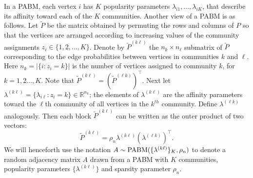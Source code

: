 \documentclass[12pt]{article}
\begin{document}
\begin{remark}
  \label{rem:pabm_view2}
In a PABM, each vertex $i$ has $K$ popularity parameters 
$\lambda_{i1}, \dots, \lambda_{iK}$, that describe its affinity
toward each of the $K$ communities. %
Another view of a PABM is as follows.
Let $\tilde{P}$ be the matrix obtained by permuting the rows and
columns of $P$ so that the vertices are arranged according to
increasing values of the community assignments $z_i \in
\{1,2,\dots,K\}$. Denote by $\tilde{P}^{(k \ell)}$ the $n_k \times n_{\ell}$
submatrix of $\tilde{P}$ corresponding to the
edge probabilities between vertices in communities
$k$ and $\ell$. Here $n_k = |\{ i \colon z_i = k\}|$ is the number of
vertices assigned to community $k$, for $k = 1,2\dots,K$.
Note that $\tilde{P}^{(k \ell)} = (\tilde{P}^{(\ell k)})^\top$. Next
let $\lambda^{(k \ell)} = \{\lambda_{i \ell} \colon z_i = k\} \in
\mathbb{R}^{n_k}$; the elements of $\lambda^{(k \ell)}$ are the affinity parameters toward the $\ell$th community of
all vertices in the $k^{th}$ community. Define $\lambda^{(\ell k)}$
analogously. Then each block $\tilde{P}^{(k \ell)}$ can be written as the outer product of two vectors:
\begin{equation} \label{eq:pabm}
  \tilde{P}^{(k \ell)} = \rho_n \lambda^{(k \ell)} (\lambda^{(\ell k)})^{\top}.
\end{equation}
We will henceforth use the notation \(A \sim \mathrm{PABM}(\{\lambda^{(k
  \ell)}\}_K, \rho_n)\) to denote
a random adjacency matrix \(A\) drawn from a PABM with $K$ communities, popularity parameters
\(\{\lambda^{(k \ell)}\}\) and sparsity parameter $\rho_n$.
\end{remark}
\end{document}

